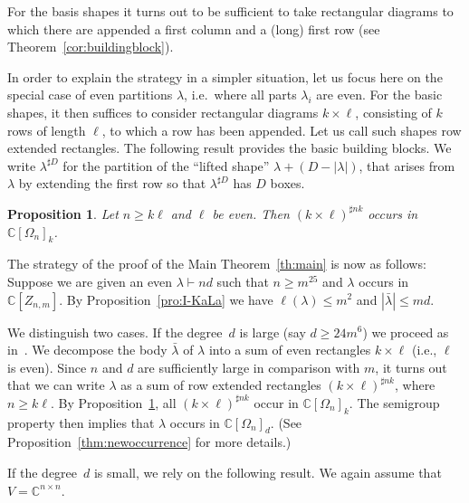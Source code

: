 \documentclass[11pt]{amsart}
\def\C{\mathbb{C}}
\newcommand{\Det}{\Omega}
\def\la{\lambda}
\newcommand{\IC}{\ensuremath{\mathbb{C}}}
\numberwithin{equation}{section}
\newtheorem{proposition}[theorem]{Proposition}
\begin{document}
For the basis shapes it turns out to be sufficient to take rectangular diagrams 
to which there are appended a first column and a (long) first row
(see Theorem~\ref{cor:buildingblock}).  

In order to explain the strategy in a simpler situation, %
let us focus here on the special case of even partitions $\la$, i.e.\ where all parts $\la_i$ are even. 
For the basic shapes, it then suffices to consider rectangular diagrams $k\times \ell$, 
consisting of $k$ rows of length $\ell$, to which a row has been appended. 
Let us call such shapes row extended rectangles. 
The following result provides the basic building blocks. 
We write $\la^{\sharp D}$ for the partition of the ``lifted shape'' $\la+(D-|\la|)$, 
that arises from $\la$ by extending the first row so that $\la^{\sharp D}$ has $D$ boxes.

\begin{proposition}\label{pro:I-explicitHWV}
Let $n \ge k\ell$ and $\ell$ be even. 
Then $(k\times \ell)^{\sharp nk}$ occurs in $\IC[\Det_n]_k$. 
\end{proposition}


The strategy of the proof of the Main Theorem~\ref{th:main} is now as follows: 
Suppose we are given an even $\la\vdash nd$ such that $n \ge m^{25}$ and 
$\la$ occurs in $\C[Z_{n,m}]$. 
By Proposition~\ref{pro:I-KaLa} we have 
$\ell(\la)\leq m^2$ and $|\bar\la|\leq md$.

We distinguish two cases. 
If the degree~$d$ is large (say $d \ge 24m^6$) we proceed as in~\cite{ik-panova:15}.  
We decompose the body $\bar\la$ of $\la$ into a sum of even rectangles $k\times \ell$ (i.e., $\ell$ is even). 
Since $n$ and $d$ are sufficiently large in comparison with $m$, 
it turns out that we can write $\la$ as a sum of row extended rectangles $(k \times \ell)^{\sharp nk}$, 
where $n\ge k\ell$.
By Proposition~\ref{pro:I-explicitHWV}, all $(k \times \ell)^{\sharp nk}$ 
occur in $\IC[\Det_n]_k$. The semigroup property then implies that 
$\la$ occurs in $\IC[\Det_n]_d$. 
(See Proposition~\ref{thm:newoccurrence} for more details.) 

If the degree~$d$ is small, we rely on the following result. 
We again assume that $V=\C^{n\times n}$. 
\end{document}
